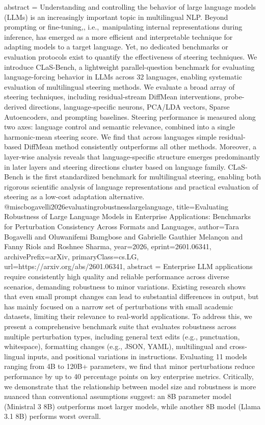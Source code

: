{      abstract = {Understanding and controlling the behavior of large language models (LLMs) is an increasingly important topic in multilingual NLP. Beyond prompting or fine-tuning,, i.e.,~manipulating internal representations during inference, has emerged as a more efficient and interpretable technique for adapting models to a target language. Yet, no dedicated benchmarks or evaluation protocols exist to quantify the effectiveness of steering techniques. We introduce CLaS-Bench, a lightweight parallel-question benchmark for evaluating language-forcing behavior in LLMs across 32 languages, enabling systematic evaluation of multilingual steering methods. We evaluate a broad array of steering techniques, including residual-stream DiffMean interventions, probe-derived directions, language-specific neurons, PCA/LDA vectors, Sparse Autoencoders, and prompting baselines. Steering performance is measured along two axes: language control and semantic relevance, combined into a single harmonic-mean steering score. We find that across languages simple residual-based DiffMean method consistently outperforms all other methods. Moreover, a layer-wise analysis reveals that language-specific structure emerges predominantly in later layers and steering directions cluster based on language family. CLaS-Bench is the first standardized benchmark for multilingual steering, enabling both rigorous scientific analysis of language representations and practical evaluation of steering as a low-cost adaptation alternative.}
}@misc{bogavelli2026evaluatingrobustnesslargelanguage,
      title={Evaluating Robustness of Large Language Models in Enterprise Applications: Benchmarks for Perturbation Consistency Across Formats and Languages}, 
      author={Tara Bogavelli and Oluwanifemi Bamgbose and Gabrielle Gauthier Melançon and Fanny Riols and Roshnee Sharma},
      year={2026},
      eprint={2601.06341},
      archivePrefix={arXiv},
      primaryClass={cs.LG},
      url={https://arxiv.org/abs/2601.06341},
      abstract = {Enterprise LLM applications require consistently high quality and reliable performance across diverse scenarios, demanding robustness to minor variations. Existing research shows that even small prompt changes can lead to substantial differences in output, but has mainly focused on a narrow set of perturbations with small academic datasets, limiting their relevance to real-world applications. To address this, we present a comprehensive benchmark suite that evaluates robustness across multiple perturbation types, including general text edits (e.g., punctuation, whitespace), formatting changes (e.g., JSON, YAML), multilingual and cross-lingual inputs, and positional variations in instructions. Evaluating 11 models ranging from 4B to 120B+ parameters, we find that minor perturbations reduce performance by up to 40 percentage points on key enterprise metrics. Critically, we demonstrate that the relationship between model size and robustness is more nuanced than conventional assumptions suggest: an 8B parameter model (Ministral 3 8B) outperforms most larger models, while another 8B model (Llama 3.1 8B) performs worst overall.}
}
